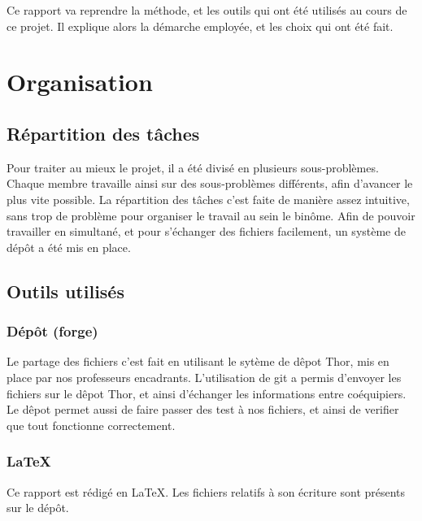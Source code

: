 \documentclass{article}
\begin{document}
Ce rapport va reprendre la m\'ethode, et les outils qui ont \'et\'e utilis\'es au cours de ce projet.
Il explique alors la d\'emarche employ\'ee, et les choix qui ont \'et\'e fait. 

\vspace*{25mm}

\section{Organisation}

\subsection{R\'epartition des t\^aches}
Pour traiter au mieux le projet, il a \'et\'e divis\'e en plusieurs sous-probl\`emes.
Chaque membre travaille ainsi sur des sous-probl\`emes diff\'erents, afin d'avancer le plus vite possible.
La r\'epartition des t\^aches c'est faite de mani\`ere assez intuitive, sans trop de probl\`eme pour organiser le travail au sein le bin\^ome. 
Afin de pouvoir travailler en simultan\'e, et pour s'\'echanger des fichiers facilement, un syst\`eme de d\'ep\^ot a \'et\'e mis en place. 

\subsection{Outils utilis\'es}

\subsubsection{D\'ep\^ot (forge)}

Le partage des fichiers c'est fait en utilisant le syt\`eme de d\^epot Thor, mis en place par nos professeurs encadrants. 
L'utilisation de git a permis d'envoyer les fichiers sur le d\^epot Thor, et ainsi d'\'echanger les informations entre co\'equipiers.
Le d\^epot permet aussi de faire passer des test \`a nos fichiers, et ainsi de verifier que tout fonctionne correctement. 
 

\subsubsection{\LaTeX}

Ce rapport est r\'edig\'e en \LaTeX. Les fichiers relatifs \`a son \'ecriture sont pr\'esents sur le d\'ep\^ot. 
\end{document}
